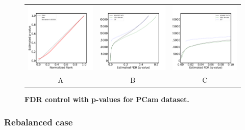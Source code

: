 \documentclass{article}
\begin{document}
\begin{figure}
	\advance\leftskip-0.5cm
	\begin{tabular}{ccc}
 		\includegraphics[width=2.5in]{img/pcam_QQ.pdf} &
		\includegraphics[width=2.5in]{img/pcam_fdr_control.pdf} & 
            \includegraphics[width=2.5in]{img/pcam_fdr_control_loc.pdf}
		\\	
		A & B & C
	\end{tabular}
	\caption{\bf FDR control with p-values for PCam dataset.}
	\label{fig:pcam}
\end{figure} 

\subsubsection{Rebalanced case}
\end{document}
